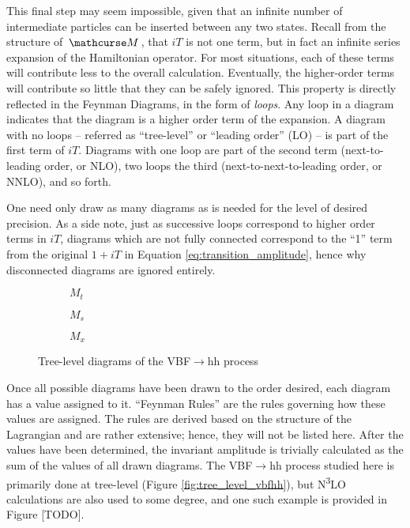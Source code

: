     This final step may seem impossible, given that an infinite number of intermediate particles can be inserted between any two states.
    Recall from the structure of $\invAmp$, that $iT$ is not one term, but in fact an infinite series expansion of the Hamiltonian operator.
    For most situations, each of these terms will contribute less to the overall calculation.
    Eventually, the higher-order terms will contribute so little that they can be safely ignored.
    This property is directly reflected in the Feynman Diagrams, in the form of \textit{loops}.
    Any loop in a diagram indicates that the diagram is a higher order term of the expansion.
    A diagram with no loops -- referred as ``tree-level'' or ``leading order'' (LO) -- is part of the first term of $iT$.
    Diagrams with one loop are part of the second term (next-to-leading order, or NLO),
        two loops the third (next-to-next-to-leading order, or NNLO), and so forth.

    One need only draw as many diagrams as is needed for the level of desired precision.
    As a side note, just as successive loops correspond to higher order terms in $iT$,
        diagrams which are not fully connected correspond to the ``1'' term from the original $1+iT$ in Equation \ref{eq:transition_amplitude},
        hence why disconnected diagrams are ignored entirely.

    \begin{figure} \label{fig:tree_level_vbfhh}
    \centering
    \begin{subfigure}[$M_t$]{0.3\textwidth} 
         
        \caption{$M_t$}
        \label{fig:tree_level_vbfhh:kv}
    \end{subfigure}
    \begin{subfigure}{0.3\textwidth}
         
        \caption{$M_s$}
        \label{fig:tree_level_vbfhh:kl}
    \end{subfigure}
    \begin{subfigure}{0.3\textwidth}
         
        \caption{$M_x$}
        \label{fig:tree_level_vbfhh:k2v}
    \end{subfigure}
    \caption{Tree-level diagrams of the VBF$\rightarrow$hh process}
    \end{figure}

    Once all possible diagrams have been drawn to the order desired, each diagram has a value assigned to it.
    ``Feynman Rules'' are the rules governing how these values are assigned.
    The rules are derived based on the structure of the Lagrangian and are rather extensive;
        hence, they will not be listed here.
    After the values have been determined, the invariant amplitude is trivially calculated as the sum of the values of all drawn diagrams.
    The VBF$\to$hh process studied here is primarily done at tree-level (Figure \ref{fig:tree_level_vbfhh}),
        but N\textsuperscript{3}LO calculations are also used to some degree, and one such example is provided in Figure [TODO]. %

